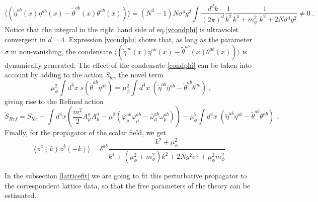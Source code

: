 \begin{equation}
 \langle ( \tilde{\eta}^{ab}(x)  {\eta}^{ab}(x)  -  \tilde{\theta}^{ab}(x)  {\theta}^{ab}(x) ) \rangle = (N^2-1) N \sigma^4 g^2  \int \frac{ d^dk}{(2\pi)^d} \frac{1}{k^2} 
 \frac{1}{k^4 + m^2_\phi \;k^2 +  2 N \sigma^4 g^2}   \neq 0 \;. \label{vcondphi}
\end{equation}
Notice that the integral in the right hand side of eq.\eqref{vcondphi} is ultraviolet convergent in $d=4$. Expression  \eqref{vcondphi} shows that, as long as the parameter $\sigma$ in non-vanishing, the condensate $\langle ( \tilde{\eta}^{ab}(x)  {\eta}^{ab}(x)  -  \tilde{\theta}^{ab}(x)  {\theta}^{ab}(x) ) \rangle$ is dynamically generated. The effect of the condensate 
 \eqref{condphi}  can be taken into account by adding to the action $S_{ loc}$ the novel term 
\begin{equation}
\mu^2_\phi \int d^4x \; s ( \tilde{\theta}^{ab} {\eta}^{ab} )  = \mu^2_\phi \int d^4x\;  ( \tilde{\eta}^{ab}  {\eta}^{ab}  -  \tilde{\theta}^{ab}  {\theta}^{ab} )   \;,  \label{accondphi}
\end{equation}
giving rise to the  Refined action 
\begin{equation}
{\tilde S}_{Ref} =  S_{ loc} +  \int d^4x \left(  \frac{m^2}{2} A^a_\mu A^a_\mu  - \mu^2 \left( {\bar \varphi}^{ab}_{\mu}  { \varphi}^{ab}_{\mu} -  {\bar \omega}^{ab}_{\mu}  { \omega}^{ab}_{\mu} \right)   \right)    - \mu^2_\phi \int d^4x\;  \left( \tilde{\eta}^{ab}  {\eta}^{ab}  -  \tilde{\theta}^{ab}  {\theta}^{ab} \right)  \;. \label{refphi}
\end{equation}
Finally, for the propagator of the scalar field, we get 
\begin{equation} 
\langle  \phi^a(k)  \phi^b(-k) \rangle   =   \delta^{ab}   \frac{k^2 +\mu^2_{\phi}}{k^4 +
(\mu^2_\phi+m^2_{\phi})k^2 + 2Ng^2\sigma^4 + \mu^2_\phi m^2_\phi}  \;. 
\label{phiprop}
\end{equation} 

In the subsection \ref{latticefit} we are going to fit this perturbative propagator to the
correspondent lattice data, so that the free parameters of the theory can be estimated.





